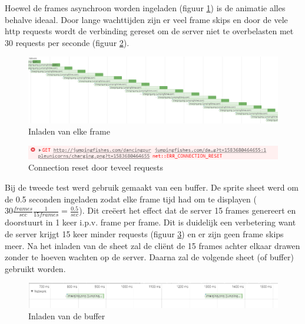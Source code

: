 Hoewel de frames asynchroon worden ingeladen (figuur \ref{inladen}) is de animatie alles behalve ideaal. Door lange wachttijden zijn er veel frame skips en door de vele http requests wordt de verbinding gereset om de server niet te overbelasten met 30 requests per seconde (figuur \ref{reset}).

\begin{figure} [H]
	\centering
	\includegraphics [scale=0.3] {img/inladen.png}
	\caption{Inladen van elke frame} \label{inladen}
\end{figure}

\begin{figure} [H]
	\centering
	\includegraphics [scale=0.7] {img/reset.png}
	\caption{Connection reset door teveel requests} \label{reset}
\end{figure}

Bij de tweede test werd gebruik gemaakt van een buffer. De sprite sheet werd om de 0.5 seconden ingeladen zodat elke frame tijd had om te displayen ($30 \frac{frames}{sec} \frac{1}{15 frames}=\frac{0.5}{sec} $). Dit creëert het effect dat de server 15 frames genereert en doorstuurt in 1 keer i.p.v. frame per frame. Dit is duidelijk een verbetering want de server krijgt 15 keer minder requests (figuur \ref{inladen2}) en er zijn geen frame skips meer. Na het inladen van de sheet zal de cliënt de 15 frames achter elkaar drawen zonder te hoeven wachten op de server. Daarna zal de volgende sheet (of buffer) gebruikt worden.

\begin{figure} [H]
	\centering
	\includegraphics [scale=0.7] {img/inladen2.png}
	\caption{Inladen van de buffer} \label{inladen2}
\end{figure}